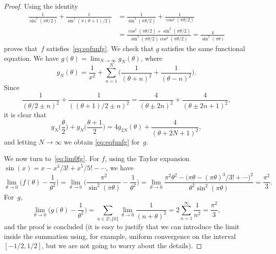\documentclass[11pt, oneside]{article}
\newcommand{\Z}{\mathbb{Z}}
\theoremstyle{plain}
\theoremstyle{definition}
\begin{document}
\begin{proof}
Using the identity
\begin{align*}
  \frac{1}{\sin^2(\pi\theta/2)} + \frac{1}{\sin^2(\pi(\theta+1)/2)}
  &= \frac{1}{\sin^2(\pi\theta/2)} + \frac{1}{\cos^2(\pi\theta/2)} \\
  &= \frac{\cos^2(\pi\theta/2) + \sin^2(\pi\theta/2)}{\sin^2(\pi\theta/2)\cos^2(\pi\theta/2)}
  = \frac{4}{\sin^2(\pi\theta)}
\end{align*}
proves that~$f$ satisfies~\eqref{eq:eqfunfg}.
We check that $g$ satisfies the same functional equation. We have $g(\theta) = \lim_{N\to\infty} g_N(\theta)$, where
\[
  g_N(\theta) = \frac{1}{x^2} 
  + \sum_{n=1}^{N} \Big( \frac{1}{(\theta+n)^2} + \frac{1}{(\theta-n)^2} \Big).
\]
Since
\[
  \frac{1}{(\theta/2 \pm n)^2} + \frac{1}{((\theta+1)/2 \pm n)^2}
  = \frac{4}{(\theta \pm 2n)^2} + \frac{4}{(\theta \pm 2n+1)^2},
\]
it is clear that
\[
  g_N\Big(\frac{\theta}{2}\Big) + g_N\Big(\frac{\theta+1}{2}\Big)
  = 4g_{2N}(\theta) + \frac{4}{(\theta+2N+1)^2},
\]
and letting $N\to\infty$ we obtain \eqref{eq:eqfunfg} for~$g$.

We now turn to~\eqref{eq:lim0fg}.
For $f$, using the Taylor expansion $\sin(x) = x - x^3/3! + x^5/5! - \cdots$, we have
\[
  \lim_{\theta\to0} \Big( f(\theta) - \frac{1}{\theta^2} \Big)
  = \lim_{\theta\to0} \Big( \frac{\pi^2}{\sin^2(\pi\theta)} - \frac{1}{\theta^2} \Big)
  = \lim_{\theta\to0} \frac{\pi^2\theta^2 - \big(\pi\theta - (\pi\theta)^3/3! 
  + \cdots\big)^2}{\theta^2 \sin^2(\pi\theta)}
  = \frac{\pi^2}{3}.
\]
For~$g$, 
\[
  \lim_{\theta\to0} \Big( g(\theta) - \frac{1}{\theta^2} \Big) 
  = \sum_{n\in\Z\setminus\{0\}} \lim_{\theta\to0} \frac{1}{(n+\theta)^2}
  = 2 \sum_{n=1}^{\infty} \frac{1}{n^2} = \frac{\pi^2}{3},
\]
and the proof is concluded (it is easy to justify that we can introduce the limit inside the summation using, for example, uniform convergence on the interval $[-1/2,1/2]$, but we are not going to worry about the details).
\end{proof}
\end{document}
